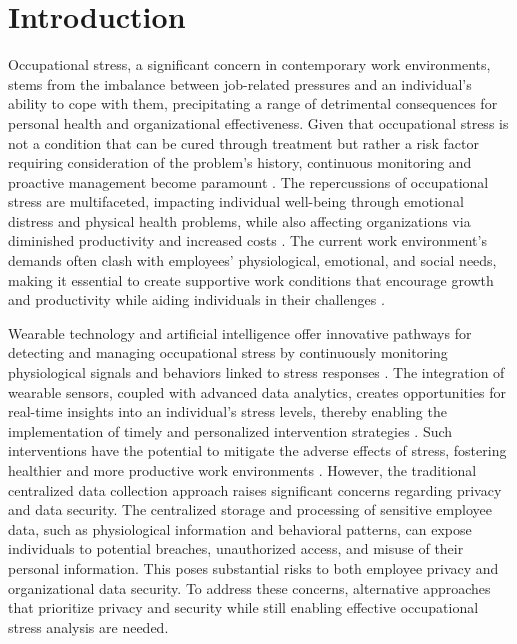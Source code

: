 \documentclass[12pt]{article}
\begin{document}
\newpage

\section{Introduction}


Occupational stress, a significant concern in contemporary work environments, stems from the imbalance between job-related pressures and an individual's ability to cope with them, precipitating a range of detrimental consequences for personal health and organizational effectiveness. Given that occupational stress is not a condition that can be cured through treatment but rather a risk factor requiring consideration of the problem's history, continuous monitoring and proactive management become paramount \cite{james_campbell_quick_f0fffc85}. The repercussions of occupational stress are multifaceted, impacting individual well-being through emotional distress and physical health problems, while also affecting organizations via diminished productivity and increased costs \cite{james_campbell_quick_f0fffc85, paul_e__spector_2bae7a3d, shiyi_jiang_d0702d3b}. The current work environment's demands often clash with employees' physiological, emotional, and social needs, making it essential to create supportive work conditions that encourage growth and productivity while aiding individuals in their challenges \cite{agnese_mariotti_dd5ad5ca}. 


Wearable technology and artificial intelligence offer innovative pathways for detecting and managing occupational stress by continuously monitoring physiological signals and behaviors linked to stress responses \cite{james_campbell_quick_f0fffc85}. The integration of wearable sensors, coupled with advanced data analytics, creates opportunities for real-time insights into an individual's stress levels, thereby enabling the implementation of timely and personalized intervention strategies \cite{reham_alhejaili_14968434, mazin_alshamrani_65eed49a}. Such interventions have the potential to mitigate the adverse effects of stress, fostering healthier and more productive work environments \cite{jerry_chen_fd58cab0}. However, the traditional centralized data collection approach raises significant concerns regarding privacy and data security. The centralized storage and processing of sensitive employee data, such as physiological information and behavioral patterns, can expose individuals to potential breaches, unauthorized access, and misuse of their personal information. This poses substantial risks to both employee privacy and organizational data security. To address these concerns, alternative approaches that prioritize privacy and security while still enabling effective occupational stress analysis are needed.
\end{document}
